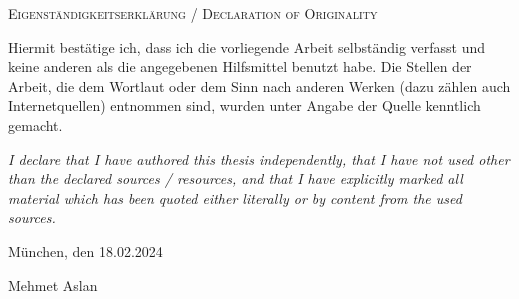 {
\large
\thispagestyle{empty}
\vspace*{\fill}

\noindent
\textsc{Eigenständigkeitserklärung / Declaration of Originality}

\medskip

\noindent
Hiermit bestätige ich, dass ich die vorliegende Arbeit selbständig verfasst und keine anderen als die angegebenen Hilfsmittel benutzt habe. Die Stellen der Arbeit, die dem Wortlaut oder dem Sinn nach anderen Werken (dazu zählen auch Internetquellen) entnommen sind, wurden unter Angabe der Quelle kenntlich gemacht.

\medskip

\textit{I declare that I have authored this thesis independently, that I have not used other than the declared sources / resources, and that I have explicitly marked all material which has been quoted either literally or by content from the used sources.}

\bigskip

\noindent
München, den 18.02.2024

\vspace*{2cm}

\noindent
Mehmet Aslan
}

